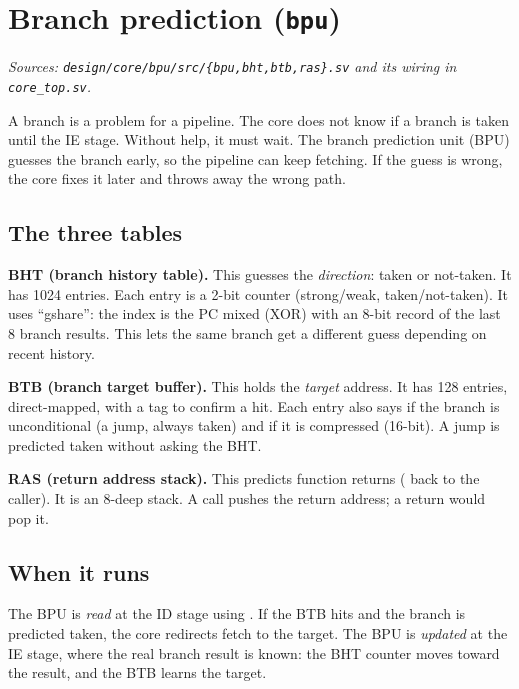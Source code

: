 \section{Branch prediction (\texttt{bpu})}
\textit{Sources: \texttt{design/core/bpu/src/\{bpu,bht,btb,ras\}.sv} and its
wiring in \texttt{core\_top.sv}.}

A branch is a problem for a pipeline. The core does not know if a branch is taken
until the IE stage. Without help, it must wait. The branch prediction unit (BPU)
guesses the branch early, so the pipeline can keep fetching. If the guess is
wrong, the core fixes it later and throws away the wrong path.


\subsection{The three tables}
\textbf{BHT (branch history table).} This guesses the \emph{direction}: taken or
not-taken. It has 1024 entries. Each entry is a 2-bit counter (strong/weak,
taken/not-taken). It uses ``gshare'': the index is the PC mixed (XOR) with an
8-bit record of the last 8 branch results. This lets the same branch get a
different guess depending on recent history.

\textbf{BTB (branch target buffer).} This holds the \emph{target} address. It has
128 entries, direct-mapped, with a tag to confirm a hit. Each entry also says if
the branch is unconditional (a jump, always taken) and if it is compressed
(16-bit). A jump is predicted taken without asking the BHT.

\textbf{RAS (return address stack).} This predicts function returns
( back to the caller). It is an 8-deep stack. A call pushes the return
address; a return would pop it.

\subsection{When it runs}
The BPU is \emph{read} at the ID stage using . If the BTB hits and
the branch is predicted taken, the core redirects fetch to the target. The BPU is
\emph{updated} at the IE stage, where the real branch result is known: the BHT
counter moves toward the result, and the BTB learns the target.

